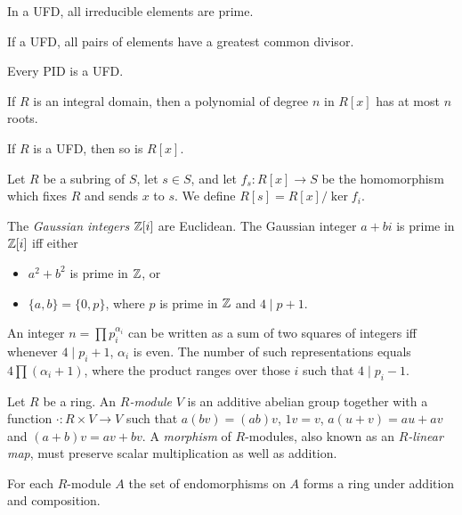 \begin{prop}
    In a UFD, all irreducible elements are prime.
\end{prop}
\begin{prop}
    If a UFD, all pairs of elements have a greatest common divisor.
\end{prop}
\begin{thm}
    Every PID is a UFD\@.
\end{thm}
\begin{cor}
    If $R$ is an integral domain, then a polynomial of degree $n$ in $R[x]$ has
    at most $n$ roots.
\end{cor}
\begin{thm}
    If $R$ is a UFD, then so is $R[x]$.
\end{thm}
\begin{defn}
    Let $R$ be a subring of $S$, let $s\in S$, and let $f_s:R[x]\to S$ be the
    homomorphism which fixes $R$ and sends $x$ to $s$. We define $R[s]=R[x]/\ker
    f_i$.
\end{defn}
\begin{prop}
    The \emph{Gaussian integers} $\mathbb{Z}[i]$ are Euclidean. The Gaussian integer
    $a+bi$ is prime in $\mathbb{Z}[i]$ iff either
    \begin{itemize}
        \item $a^2+b^2$ is prime in $\mathbb{Z}$, or
        \item $\{a,b\}=\{0,p\}$, where $p$ is prime in $\mathbb{Z}$ and $4\mid p+1$.
    \end{itemize}
\end{prop}
\begin{cor}
    An integer $n=\prod p_i^{\alpha_i}$ can be written as a sum of two
    squares of integers iff whenever $4\mid p_i+1$, $\alpha_i$
    is even. The number of such representations equals $4\prod (\alpha_i+1)$,
    where the product ranges over those $i$ such that $4\mid p_i-1$.
\end{cor}
\begin{defn}
    Let $R$ be a ring. An \emph{$R$-module} $V$ is an additive abelian group
    together with a function $\cdot:R\times V\to V$ such that $a(bv)=(ab)v$,
    $1v=v$, $a(u+v)=au+av$ and $(a+b)v=av+bv$. A \emph{morphism} of $R$-modules,
    also known as an \emph{$R$-linear map}, must preserve scalar multiplication
    as well as addition.
\end{defn}
\begin{prop}
    For each $R$-module $A$ the set of endomorphisms on $A$ forms a ring under
    addition and composition.
\end{prop}
